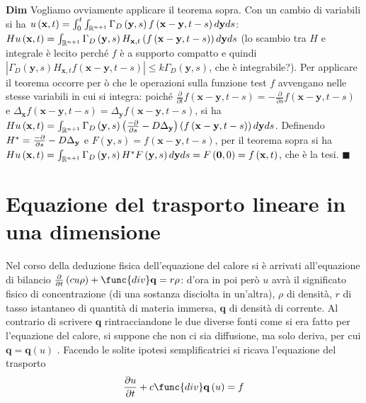 \documentclass{article}
\begin{document}
\textbf{Dim} Vogliamo ovviamente applicare il teorema sopra. Con un cambio
di variabili si ha $u\left( \mathbf{x},t\right) =\int_{0}^{t}\int_{%
\mathbb{R}
^{n+1}}\Gamma _{D}\left( \mathbf{y},s\right) f\left( \mathbf{x-y},t-s\right)
d\mathbf{y}ds$: $Hu\left( \mathbf{x},t\right) =\int_{%
\mathbb{R}
^{n+1}}\Gamma _{D}\left( \mathbf{y},s\right) H_{\mathbf{x},t}\left( f\left( 
\mathbf{x-y},t-s\right) \right) d\mathbf{y}ds$ (lo scambio tra $H$ e
integrale \`{e} lecito perch\'{e} $f$ \`{e} a supporto compatto e quindi $%
\left\vert \Gamma _{D}\left( \mathbf{y},s\right) H_{\mathbf{x},t}f\left( 
\mathbf{x-y},t-s\right) \right\vert \leq k\Gamma _{D}\left( \mathbf{y}%
,s\right) $, che \`{e} integrabile?). Per applicare il teorema occorre per%
\`{o} che le operazioni sulla funzione test $f$ avvengano nelle stesse
variabili in cui si integra: poich\'{e} $\frac{\partial }{\partial t}f\left( 
\mathbf{x-y},t-s\right) =-\frac{\partial }{\partial s}f\left( \mathbf{x-y}%
,t-s\right) $ e $\Delta _{\mathbf{x}}f\left( \mathbf{x-y},t-s\right) =\Delta
_{\mathbf{y}}f\left( \mathbf{x-y},t-s\right) $, si ha $Hu\left( \mathbf{x}%
,t\right) =\int_{%
\mathbb{R}
^{n+1}}\Gamma _{D}\left( \mathbf{y},s\right) \left( \frac{-\partial }{%
\partial s}-D\Delta _{\mathbf{y}}\right) \left( f\left( \mathbf{x-y}%
,t-s\right) \right) d\mathbf{y}ds$. Definendo $H^{\ast }=\frac{-\partial }{%
\partial s}-D\Delta _{\mathbf{y}}$ e $F\left( \mathbf{y},s\right) =f\left( 
\mathbf{x-y},t-s\right) $, per il teorema sopra si ha $Hu\left( \mathbf{x}%
,t\right) =\int_{%
\mathbb{R}
^{n+1}}\Gamma _{D}\left( \mathbf{y},s\right) H^{\ast }F\left( \mathbf{y}%
,s\right) d\mathbf{y}ds=F\left( \mathbf{0},0\right) =f\left( \mathbf{x}%
,t\right) $, che \`{e} la tesi. $\blacksquare $

\section{Equazione del trasporto lineare in una dimensione}

Nel corso della deduzione fisica dell'equazione del calore si \`{e} arrivati
all'equazione di bilancio $\frac{\partial }{\partial t}\left( cu\rho \right)
+\func{div}\mathbf{q}=r\rho $: d'ora in poi per\`{o} $u$ avr\`{a} il
significato fisico di concentrazione (di una sostanza disciolta in
un'altra), $\rho $ di densit\`{a}, $r$ di tasso istantaneo di
quantit\`{a} di materia immersa, $\mathbf{q}$ di densit\`{a} di
corrente. Al contrario di scrivere $\mathbf{q}$ rintracciandone le due
diverse fonti come si era fatto per l'equazione del calore, si suppone che
non ci sia diffusione, ma solo deriva, per cui $\mathbf{q=q}\left( u\right) $%
. Facendo le solite ipotesi semplificatrici si ricava l'equazione del
trasporto%
\begin{equation*}
\frac{\partial u}{\partial t}+c\func{div}\mathbf{q}\left( u\right) =f
\end{equation*}
\end{document}
